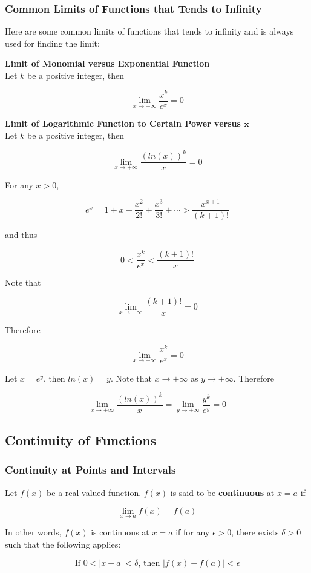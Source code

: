 \subsubsection{Common Limits of Functions that Tends to Infinity}
\begin{thm}
  Here are some common limits of functions that tends to infinity and is always used for finding the limit:

  \begin{alist}
    \item \textbf{Limit of Monomial versus Exponential Function}\\
    Let $k$ be a positive integer, then

    $$\lim_{x\to +\infty}\frac{x^{k}}{e^{x}}=0$$

    \item \textbf{Limit of Logarithmic Function to Certain Power versus $\boldsymbol{x}$}\\
    Let $k$ be a positive integer, then

    $$\lim_{x\to +\infty}\frac{(ln(x))^{k}}{x}=0$$

  \end{alist}

   For any $x>0$,

  $$e^{x}=1+x+\frac{x^{2}}{2!}+\frac{x^{3}}{3!}+\cdots>\frac{x^{x+1}}{(k+1)!}$$\s

  and thus

  $$0<\frac{x^{k}}{e^{x}}<\frac{(k+1)!}{x}$$\s

  Note that

  $$\lim_{x\to +\infty}\frac{(k+1)!}{x}=0$$\s

  Therefore

  $$\lim_{x\to +\infty}\frac{x^{k}}{e^{x}}=0$$\s

   Let $x=e^{y}$, then $ln(x)=y$. Note that $x\to +\infty$ as $y\to +\infty$. Therefore

  $$\lim_{x\to +\infty}\frac{(ln(x))^{k}}{x}=\lim_{y\to +\infty}\frac{y^{k}}{e^{y}}=0$$
\end{thm}

\subsection{Continuity of Functions}
\subsubsection{Continuity at Points and Intervals}
\begin{dft}
  Let $f(x)$ be a real-valued function. $f(x)$ is said to be \textbf{continuous} at $x=a$ if

  $$\lim_{x\to a}f(x)=f(a)$$\s

  In other words, $f(x)$ is continuous at $x=a$ if for any $\epsilon>0$, there exists $\delta>0$ such that the following applies:

  $$\text{If }0<\left| x-a\right| <\delta\text{, then }\left| f(x)-f(a)\right| <\epsilon$$
\end{dft}\n

